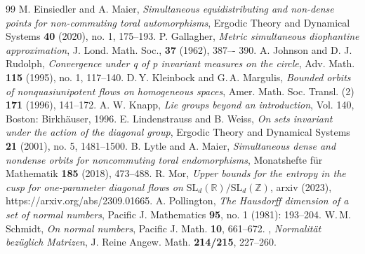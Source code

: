 \documentclass[reqno,12pt]{amsart}
\theoremstyle{definition}
\numberwithin{equation}{section}
\newcommand{\RR}{\mathbb{R}}
\newcommand{\ZZ}{\mathbb{Z}}
\newcommand{\SL}{\mathrm{SL}}
\begin{document}
{\begin{thebibliography}{99}
 M. Einsiedler and A. Maier, \textit{Simultaneous equidistributing and non-dense points for non-commuting toral automorphisms}, Ergodic Theory and Dynamical Systems {\bf 40} (2020), no. 1, 175--193.
 P. Gallagher, \textit{Metric simultaneous diophantine approximation}, J. Lond. Math. Soc., {\bf 37} (1962), 387–-
390.
 A. Johnson and D. J. Rudolph, \textit{Convergence under q of p invariant measures on the circle}, Adv. Math. {\bf 115} (1995), no. 1, 117–140.
D.\,Y. Kleinbock and G.\,A. Margulis, \textit{Bounded orbits of nonquasiunipotent flows on homogeneous spaces}, Amer. Math. Soc. Transl. (2) {\bf 171} (1996), 141--172.
 A. W. Knapp, \textit{Lie groups beyond an introduction}, Vol. 140, Boston: Birkhäuser, 1996.
  E. Lindenstrauss and B. Weiss, \textit{On sets invariant under the action of the diagonal group}, Ergodic Theory
and Dynamical Systems {\bf 21} (2001), no. 5, 1481--1500.
 B. Lytle and A. Maier, \textit{Simultaneous dense and nondense orbits for noncommuting toral endomorphisms}, Monatshefte für Mathematik {\bf 185} (2018), 473--488.
 R. Mor, \textit{Upper bounds for the entropy in the cusp for one-parameter diagonal flows on $\SL_d(\RR)/\SL_d(\ZZ)$}, arxiv (2023), https://arxiv.org/abs/2309.01665.
 A. Pollington, \textit{The Hausdorff dimension of a set of normal numbers}, Pacific J. Mathematics {\bf 95}, no. 1 (1981): 193--204.
 W.\,M. Schmidt, \textit{On normal numbers}, Pacific J. Math. {\bf 10}, 661--672.
 \bysame, \textit{Normalit\"at bez\"uglich Matrizen}, J. Reine Angew. Math. {\bf 214/215}, 227--260.



\end{thebibliography}}
\end{document}
